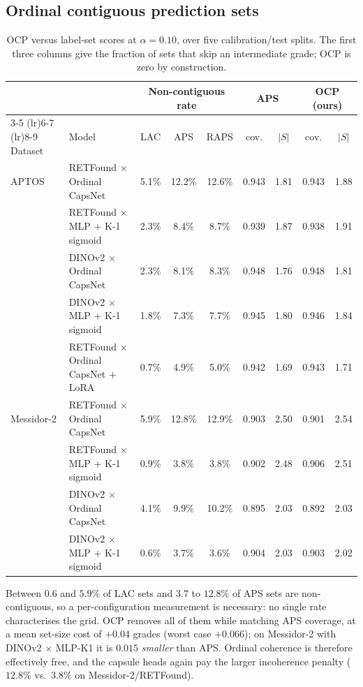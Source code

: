 \documentclass[journal]{IEEEtran}
\begin{document}
\subsection{Ordinal contiguous prediction sets}
\label{sec:ocp-results}
\begin{table}[!t]
\centering
\caption{OCP versus label-set scores at $\alpha = 0.10$, over five calibration/test splits. The first three columns give the fraction of sets that skip an intermediate grade; OCP is zero by construction.}
\label{tab:ocp}
\begin{tabular}{llccc cc cc}
\toprule
& & \multicolumn{3}{c}{Non-contiguous rate} & \multicolumn{2}{c}{APS} & \multicolumn{2}{c}{OCP (ours)} \\
\cmidrule(lr){3-5} \cmidrule(lr){6-7} \cmidrule(lr){8-9}
Dataset & Model & LAC & APS & RAPS & cov. & $|S|$ & cov. & $|S|$ \\
\midrule
APTOS & RETFound $\times$ Ordinal CapsNet & 5.1\% & 12.2\% & 12.6\% & 0.943 & 1.81 & 0.943 & 1.88 \\
 & RETFound $\times$ MLP + K-1 sigmoid & 2.3\% & 8.4\% & 8.7\% & 0.939 & 1.87 & 0.938 & 1.91 \\
 & DINOv2 $\times$ Ordinal CapsNet & 2.3\% & 8.1\% & 8.3\% & 0.948 & 1.76 & 0.948 & 1.81 \\
 & DINOv2 $\times$ MLP + K-1 sigmoid & 1.8\% & 7.3\% & 7.7\% & 0.945 & 1.80 & 0.946 & 1.84 \\
 & RETFound $\times$ Ordinal CapsNet + LoRA & 0.7\% & 4.9\% & 5.0\% & 0.942 & 1.69 & 0.943 & 1.71 \\
\midrule
Messidor-2 & RETFound $\times$ Ordinal CapsNet & 5.9\% & 12.8\% & 12.9\% & 0.903 & 2.50 & 0.901 & 2.54 \\
 & RETFound $\times$ MLP + K-1 sigmoid & 0.9\% & 3.8\% & 3.8\% & 0.902 & 2.48 & 0.906 & 2.51 \\
 & DINOv2 $\times$ Ordinal CapsNet & 4.1\% & 9.9\% & 10.2\% & 0.895 & 2.03 & 0.892 & 2.03 \\
 & DINOv2 $\times$ MLP + K-1 sigmoid & 0.6\% & 3.7\% & 3.6\% & 0.904 & 2.03 & 0.903 & 2.02 \\
\bottomrule
\end{tabular}
\end{table}

Between $0.6$ and $5.9\%$ of LAC sets and $3.7$ to $12.8\%$ of APS sets are non-contiguous, so a per-configuration measurement is necessary: no single rate characterises the grid. OCP removes all of them while matching APS coverage, at a mean set-size cost of $+0.04$ grades (worst case $+0.066$); on Messidor-2 with DINOv2 $\times$ MLP-K1 it is $0.015$ \emph{smaller} than APS. Ordinal coherence is therefore effectively free, and the capsule heads again pay the larger incoherence penalty ($12.8\%$ vs.\ $3.8\%$ on Messidor-2/RETFound).
\end{document}
